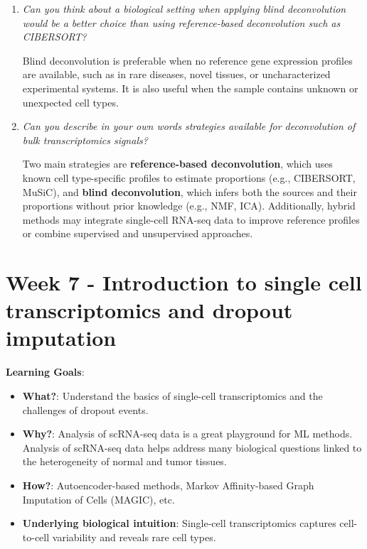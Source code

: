 \documentclass[a4paper]{article}
\begin{document}
\begin{enumerate}
    \item \textit{Can you think about a biological setting when applying blind deconvolution would be a better choice than using reference-based deconvolution such as CIBERSORT?}  
    
    Blind deconvolution is preferable when no reference gene expression profiles are available, such as in rare diseases, novel tissues, or uncharacterized experimental systems.  
    It is also useful when the sample contains unknown or unexpected cell types.  

    \item \textit{Can you describe in your own words strategies available for deconvolution of bulk transcriptomics signals?}  
    
    Two main strategies are \textbf{reference-based deconvolution}, which uses known cell type-specific profiles to estimate proportions (e.g., CIBERSORT, MuSiC), and \textbf{blind deconvolution}, which infers both the sources and their proportions without prior knowledge (e.g., NMF, ICA).  
    Additionally, hybrid methods may integrate single-cell RNA-seq data to improve reference profiles or combine supervised and unsupervised approaches.  

\end{enumerate}

\newpage

\section*{Week 7 - Introduction to single cell transcriptomics and dropout imputation}

\textbf{Learning Goals}:

\begin{itemize}
  \item \textbf{What?}: Understand the basics of single-cell transcriptomics and the challenges of dropout events.
  \item \textbf{Why?}: Analysis of scRNA-seq data is a great playground for ML methods. Analysis of scRNA-seq data helps
  address many biological questions linked to the heterogeneity of normal and tumor tissues.
  \item \textbf{How?}: Autoencoder-based methods, Markov Affinity-based Graph Imputation of Cells (MAGIC), etc.
  \item \textbf{Underlying biological intuition}: Single-cell transcriptomics captures cell-to-cell variability and reveals rare cell types.
\end{itemize}
\end{document}
